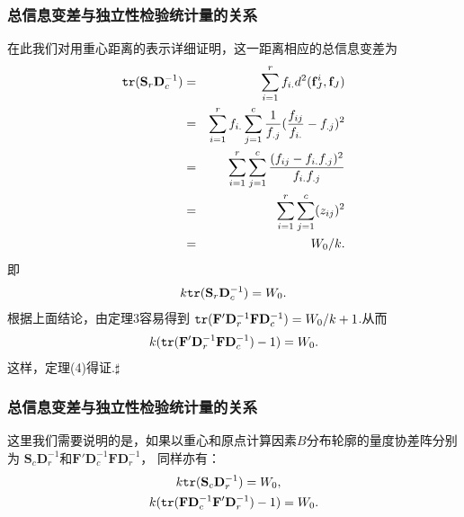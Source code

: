 \begin{frame}\frametitle{\color{blue}总信息变差与独立性检验统计量的关系}

\begin{footnotesize}
{}在此我们对用重心距离的表示详细证明，这一距离相应的总信息变差为
\begin{eqnarray}
              {\tt{tr}}(\mathbf{S}_{r}\mathbf{D}_{c}^{-1})
              &=&\sum^{r}_{i=1}f_{i.}d^{2}(\mathbf{f}^{i}_{J},\mathbf{f}_{J}) \nonumber\\
              &=&\sum^{r}_{i=1}f_{i.}\sum^{c}_{j=1}\frac{1}{f_{.j}}(\frac{f_{ij}}{f_{i.}}-f_{.j})^{2} \nonumber\\
              &=&\sum^{r}_{i=1}\sum^{c}_{j=1}\frac{(f_{ij}-f_{i.}f_{.j})^{2}}{f_{i.}f_{.j}}\nonumber\\
              &=&\sum^{r}_{i=1}\sum^{c}_{j=1}(z_{ij})^{2}        \nonumber\\
              &=&W_{0}/k. \nonumber
\end{eqnarray}
即
\begin{eqnarray}
k{\tt{tr}}(\mathbf{S}_{r}\mathbf{D}_{c}^{-1})=W_{0}.
\end{eqnarray}
根据上面结论，由定理3容易得到
             ${\tt{tr}}(\mathbf{F}'\mathbf{D}_{r}^{-1}\mathbf{F}\mathbf{D}_{c}^{-1})=W_{0}/k+1$.从而
             \begin{eqnarray}
                k({\tt{tr}}(\mathbf{F}'\mathbf{D}_{r}^{-1}\mathbf{F}\mathbf{D}_{c}^{-1})-1)=W_{0}.
             \end{eqnarray}
这样，定理(4)得证.\quad $\sharp$
 \end{footnotesize}
\end{frame}
\begin{frame}\frametitle{\color{blue}总信息变差与独立性检验统计量的关系}

 \quad\quad 这里我们需要说明的是，如果以重心和原点计算因素$B$分布轮廓的量度协差阵分别为
$\mathbf{S}_{c}\mathbf{D}_{r}^{-1}$和$\mathbf{F}'\mathbf{D}_{c}^{-1}\mathbf{F}\mathbf{D}_{r}^{-1}$，
同样亦有：
\begin{eqnarray}
    \begin{aligned}
      k{\tt{tr}}(\mathbf{S}_{c}\mathbf{D}_{r}^{-1})=W_{0},\quad\quad\quad\\
      k({\tt{tr}}(\mathbf{F}\mathbf{D}_{c}^{-1}\mathbf{F'}\mathbf{D}_{r}^{-1})-1)=W_{0}.
     \end{aligned}
\end{eqnarray}
\end{frame}
